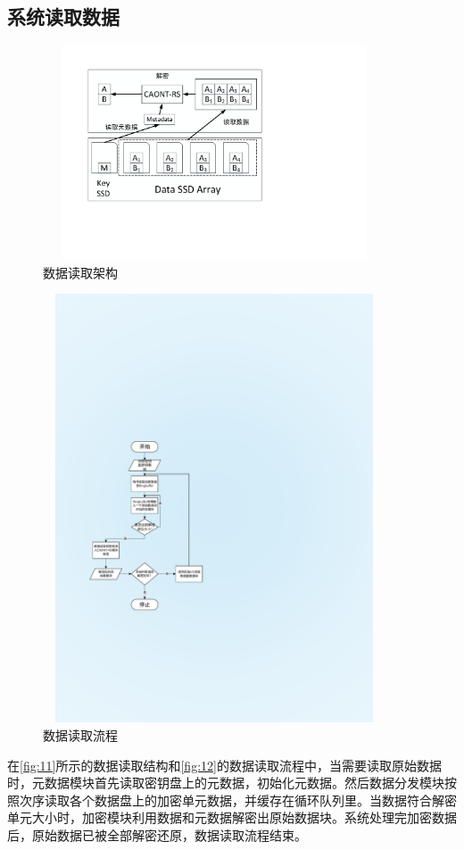 \subsection{系统读取数据}
\begin{figure}[htb]
	\centering
	\includegraphics[width=4in,height=2.5in]{Pics/data-read-st.pdf}
	\caption{数据读取架构}
    \label{fig:11}
\end{figure}
\begin{figure}[H]
	\centering
	\includegraphics[width=4in,height=5in]{Pics/data-read-pr.pdf}
	\caption{数据读取流程}
    \label{fig:12}
\end{figure}
在\autoref{fig:11}所示的数据读取结构和\autoref{fig:12}的数据读取流程中，当需要读取原始数据时，元数据模块首先读取密钥盘上的元数据，初始化元数据。然后数据分发模块按照次序读取各个数据盘上的加密单元数据，并缓存在循环队列里。当数据符合解密单元大小时，加密模块利用数据和元数据解密出原始数据块。系统处理完加密数据后，原始数据已被全部解密还原，数据读取流程结束。
